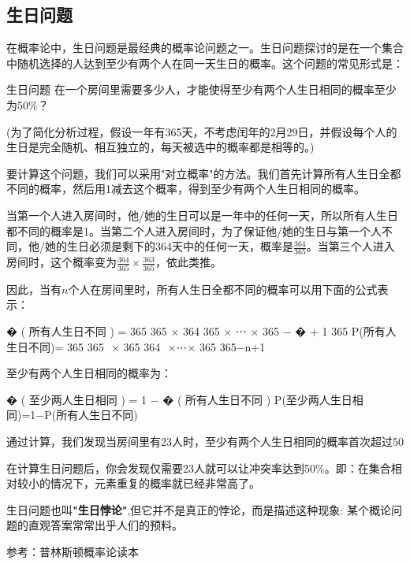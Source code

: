 
\subsection{生日问题}

在概率论中，生日问题是最经典的概率论问题之一。生日问题探讨的是在一个集合中随机选择的人达到至少有两个人在同一天生日的概率。这个问题的常见形式是：

\begin{example}{生日问题}
在一个房间里需要多少人，才能使得至少有两个人生日相同的概率至少为50\%？

(为了简化分析过程，假设一年有365天，不考虑闰年的2月29日，并假设每个人的生日是完全随机、相互独立的，每天被选中的概率都是相等的。)
\end{example}

要计算这个问题，我们可以采用"对立概率"的方法。我们首先计算所有人生日全都不同的概率，然后用1减去这个概率，得到至少有两个人生日相同的概率。



当第一个人进入房间时，他/她的生日可以是一年中的任何一天，所以所有人生日都不同的概率是1。当第二个人进入房间时，为了保证他/她的生日与第一个人不同，他/她的生日必须是剩下的364天中的任何一天，概率是$\frac{364}{365}$。当第三个人进入房间时，这个概率变为$\frac{364}{365} \times \frac{363}{365}$，依此类推。

因此，当有$n$个人在房间里时，所有人生日全都不同的概率可以用下面的公式表示：

�
(
所有人生日不同
)
=
365
365
×
364
365
×
⋯
×
365
−
�
+
1
365
P(所有人生日不同)= 
365
365
​
 × 
365
364
​
 ×⋯× 
365
365−n+1
​
 

至少有两个人生日相同的概率为：

�
(
至少两人生日相同
)
=
1
−
�
(
所有人生日不同
)
P(至少两人生日相同)=1−P(所有人生日不同)

通过计算，我们发现当房间里有23人时，至少有两个人生日相同的概率首次超过50%





在计算生日问题后，你会发现仅需要23人就可以让冲突率达到50\%。即：在集合相对较小的情况下，元素重复的概率就已经非常高了。

生日问题也叫\textbf{"生日悖论"},但它并不是真正的悖论，而是描述这种现象: 某个概论问题的直观答案常常出乎人们的预料。




参考：普林斯顿概率论读本
